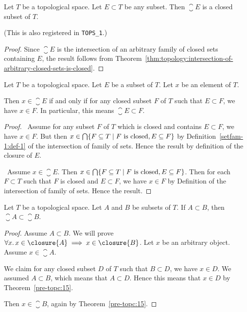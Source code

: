 \begin{theorem}\label{pre_topc:22}
Let $T$ be a topological space. Let $E\subset T$ be any subset.
Then $\closure{E}$ is a closed subset of $T$.
\end{theorem}

(This is also registered in \texttt{TOPS\_1}.)

\begin{proof}
Since $\closure{E}$ is the intersection of an arbitrary family of
closed sets containing $E$, the result follows from Theorem~\ref{thm:topology:intersection-of-arbitrary-closed-sets-is-closed}.
\end{proof}

\begin{theorem}\label{pre-topc:15}%
Let $T$ be a topological space. Let $E$ be a subset of $T$.
Let $x$ be an element of $T$.

Then $x\in\closure{E}$ if and only if for any closed subset $F$ of $T$
such that $E\subset F$, we have $x\in F$.
In particular, this means $\closure{E}\subset F$.
\end{theorem}

\begin{proof}
\backwardproof\ Assume for any subset $F$ of $T$ which is closed and
contains $E\subset F$, we have $x\in F$.
But then $x\in\Intersects\{F\subset T\mid F\mbox{ is closed}, E\subset F\}$
by Definition~\ref{setfam-1:def-1} of the intersection of family of sets.
Hence the result by definition of the closure of $E$.

\forwardproof\ Assume $x\in\closure{E}$.
Then $x\in\Intersects\{F\subset T\mid F\mbox{ is closed}, E\subset F\}$.
Then for each $F\subset T$ such that $F$ is closed and $E\subset F$,
we have $x\in F$ by Definition of the intersection of family of sets.
Hence the result.
\end{proof}

\begin{theorem}
Let $T$ be a topological space. Let $A$ and $B$ be subsets of $T$.
If $A\subset B$, then $\closure{A}\subset\closure{B}$.
\end{theorem}

\begin{proof}
Assume $A\subset B$.
We will prove $\forall x\ldotp x\in\closure{A}\implies x\in\closure{B}$.
Let $x$ be an arbitrary object.
Assume $x\in\closure{A}$.

We claim for any closed subset $D$ of $T$ such that $B\subset D$, we
have $x\in D$. We assumed $A\subset B$, which means that $A\subset D$.
Hence this means that $x\in D$ by Theorem~\ref{pre-topc:15}.

Then $x\in\closure{B}$, again by Theorem~\ref{pre-topc:15}.
\end{proof}

